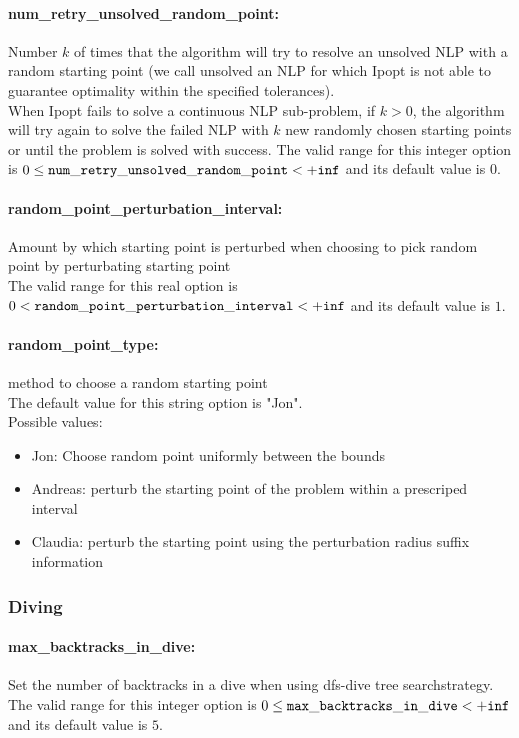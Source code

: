 \paragraph{num\_retry\_unsolved\_random\_point:} Number $k$ of times that the algorithm will try to resolve an unsolved NLP with a random starting point (we call unsolved an NLP for which Ipopt is not able to guarantee optimality within the specified tolerances). $\;$ \\
 When Ipopt fails to solve a continuous NLP
sub-problem, if $k > 0$, the algorithm will try
again to solve the failed NLP with $k$ new
randomly chosen starting points  or until the
problem is solved with success. The valid range for this integer option is
$0 \le {\tt num\_retry\_unsolved\_random\_point } <  {\tt +inf}$
and its default value is $0$.


\paragraph{random\_point\_perturbation\_interval:} Amount by which starting point is perturbed when choosing to pick random point by perturbating starting point $\;$ \\
 The valid range for this real option is 
$0 <  {\tt random\_point\_perturbation\_interval } <  {\tt +inf}$
and its default value is $1$.


\paragraph{random\_point\_type:} method to choose a random starting point $\;$ \\
The default value for this string option is "Jon".
\\ 
Possible values:
\begin{itemize}
   \item Jon: Choose random point uniformly between the bounds
   \item Andreas: perturb the starting point of the problem
within a prescriped interval
   \item Claudia: perturb the starting point using the
perturbation radius suffix information
\end{itemize}


\subsubsection{Diving}
\label{sec:Diving_options}
\paragraph{max\_backtracks\_in\_dive:} Set the number of backtracks in a dive when using dfs-dive tree searchstrategy. $\;$ \\
 The valid range for this integer option is
$0 \le {\tt max\_backtracks\_in\_dive } <  {\tt +inf}$
and its default value is $5$.


